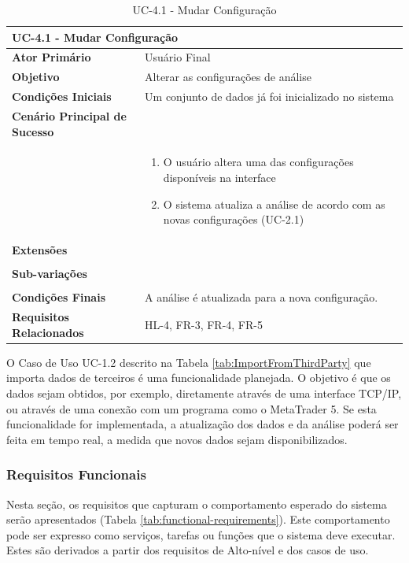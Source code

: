 \documentclass[12pt]{article}
\begin{document}
\begin{table}[H]
	\caption{UC-4.1 - Mudar Configuração}
	\label{tab:UC-4.1}
	\begin{tabular}{p{6cm} p{8cm}}
		\multicolumn{2}{l}{\large{\textbf{UC-4.1 - Mudar Configuração}}}\\
		\toprule
		\textbf{Ator Primário}		&	Usuário Final \\
		\midrule
		\textbf{Objetivo}			&	Alterar as configurações de análise \\
		\midrule
		\textbf{Condições Iniciais}	&	Um conjunto de dados já foi inicializado no sistema \\
		\midrule
		\textbf{Cenário Principal de Sucesso}	& \\
		& \begin{enumerate}
			\item O usuário altera uma das configurações disponíveis na interface
			\item O sistema atualiza a análise de acordo com as novas configurações (UC-2.1)
		\end{enumerate}\\
		\midrule
		\textbf{Extensões}	& \\
		& \\
		\midrule
		\textbf{Sub-variações} & \\
		& \\
		\midrule
		\textbf{Condições Finais} & A análise é atualizada para a nova configuração. \\
		\midrule
		\textbf{Requisitos Relacionados} & HL-4, FR-3, FR-4, FR-5\\
		\bottomrule
	\end{tabular}		
\end{table}

\endgroup

O Caso de Uso UC-1.2 descrito na Tabela \ref{tab:ImportFromThirdParty} que importa dados
de terceiros é uma funcionalidade planejada. O objetivo é que os dados sejam obtidos,
por exemplo, diretamente através de uma interface TCP/IP, ou através de uma conexão com
um programa como o MetaTrader 5. Se esta funcionalidade for implementada, a atualização
dos dados e da análise poderá ser feita em tempo real, a medida que novos dados sejam
disponibilizados.

\subsubsection{Requisitos Funcionais}

Nesta seção, os requisitos que capturam o comportamento esperado do sistema serão
apresentados (Tabela \ref{tab:functional-requirements}). Este comportamento pode ser
expresso como serviços, tarefas ou funções que o sistema deve executar.
Estes são derivados a partir dos requisitos de Alto-nível e dos casos de uso.
\end{document}
